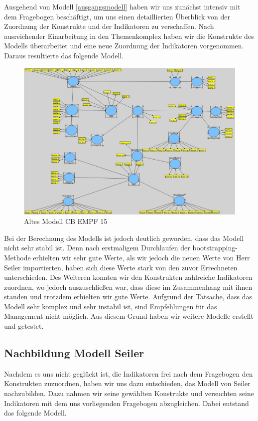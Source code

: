 \documentclass{article}\usepackage[]{graphicx}\usepackage[]{color}
\begin{document}
\newpage
Ausgehend von Modell \ref{ausgangsmodell} haben wir uns zunächst intensiv mit dem Fragebogen beschäftigt, um uns einen detaillierten Überblick von der Zuordnung der Konstrukte und der Indikatoren zu verschaffen. Nach ausreichender Einarbeitung in den Themenkomplex haben wir die Konstrukte des Modells überarbeitet und eine neue Zuordnung der Indikatoren vorgenommen. Daraus resultierte das folgende Modell.\\


\begin{figure}[h!]
\centering
\hspace*{-4.8cm}\includegraphics[scale = 0.8]{figure/erstesmodell}
\caption{Altes Modell CB EMPF 15}
\label{erstesmodell}
\end{figure}


\newpage
Bei der Berechnung des Modells ist jedoch deutlich geworden, dass das Modell nicht sehr stabil ist. Denn nach erstmaligem Durchlaufen der bootstrapping- Methode erhielten wir sehr gute Werte, als wir jedoch die neuen Werte von Herr Seiler importierten, haben sich diese Werte stark von den zuvor Errechneten unterschieden. Des Weiteren konnten wir den Konstrukten zahlreiche Indikatoren zuordnen, wo jedoch auszuschließen war, dass diese im Zusammenhang mit ihnen standen und trotzdem erhielten wir gute Werte. Aufgrund der Tatsache, dass das Modell sehr komplex und sehr instabil ist, sind Empfehlungen für das Management nicht möglich. Aus diesem Grund haben wir weitere Modelle erstellt und getestet. 

\subsection{Nachbildung Modell Seiler}
Nachdem es uns nicht geglückt ist, die Indikatoren frei nach dem Fragebogen den Konstrukten zuzuordnen, haben wir uns dazu entschieden, das Modell von Seiler nachzubilden. Dazu nahmen wir seine gewählten Konstrukte und versuchten seine Indikatoren mit dem uns vorliegenden Fragebogen abzugleichen. Dabei entstand das folgende Modell.
\end{document}
